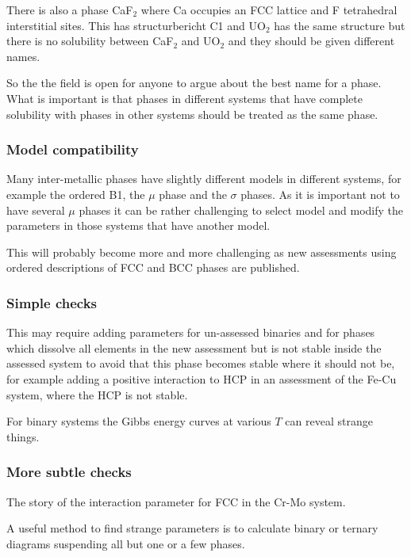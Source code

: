 \documentclass[12pt]{article}
\begin{document}
There is also a phase CaF$_2$ where Ca occupies an FCC lattice and F
tetrahedral interstitial sites.  This has structurbericht C1 and
UO$_2$ has the same structure but there is no solubility between
CaF$_2$ and UO$_2$ and they should be given different names.

So the the field is open for anyone to argue about the best name for a
phase.  What is important is that phases in different systems that
have complete solubility with phases in other systems should be
treated as the same phase.

\subsubsection{Model compatibility}

Many inter-metallic phases have slightly different models in different
systems, for example the ordered B1, the $\mu$ phase and the $\sigma$
phases.  As it is important not to have several $\mu$ phases it can be
rather challenging to select model and modify the parameters in those
systems that have another model.

This will probably become more and more challenging as new assessments
using ordered descriptions of FCC and BCC phases are published.

\subsubsection{Simple checks}

This may require adding parameters for un-assessed binaries and for
phases which dissolve all elements in the new assessment but is not
stable inside the assessed system to avoid that this phase becomes
stable where it should not be, for example adding a positive
interaction to HCP in an assessment of the Fe-Cu system, where the HCP
is not stable.

For binary systems the Gibbs energy curves at various $T$ can reveal
strange things.

\subsubsection{More subtle checks}

The story of the interaction parameter for FCC in the Cr-Mo system.

A useful method to find strange parameters is to calculate binary or
ternary diagrams suspending all but one or a few phases.
\end{document}
